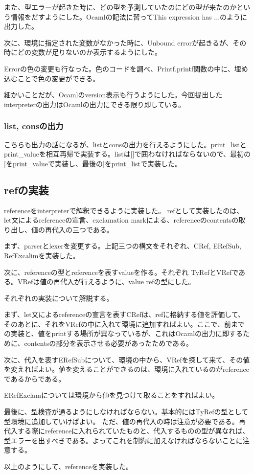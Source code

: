 \documentclass[uplatex,12pt]{jsarticle}
\begin{document}
また、型エラーが起きた時に、どの型を予測していたのにどの型が来たのかという情報をだすようにした。Ocamlの記法に習ってThis expression has ...のように出力した。

次に、環境に指定された変数がなかった時に、Unbound errorが起きるが、その時にどの変数が足りないのか表示するようにした。

Errorの色の変更も行なった。色のコードを調べ、Printf.printf関数の中に、埋め込むことで色の変更ができる。

細かいことだが、Ocamlのversion表示も行うようにした。今回提出したinterpreterの出力はOcamlの出力にできる限り即している。

\subsubsection{list, consの出力}
こちらも出力の話になるが、listとconsの出力を行えるようにした。print\_listとprint\_valueを相互再帰で実装する。listは[]で囲わなければならないので、最初の[をprint\_valueで実装し、最後の]をprint\_listで実装した。

\subsection{refの実装}
referenceをinterpreterで解釈できるように実装した。
refとして実装したのは、let文によるreferenceの宣言、exclamation markによる、referenceのcontentsの取り出し、値の再代入の三つである。

まず、parserとlexerを変更する。上記三つの構文をそれぞれ、CRef, ERefSub, RefExcalimを実装した。

次に、referenceの型とreferenceを表すvalueを作る。それぞれ
TyRefとVRefである。VRefは値の再代入が行えるように、value refの型にした。

それぞれの実装について解説する。

まず、let文によるreferenceの宣言を表すCRefは、refに格納する値を評価して、そのあとに、それをVRefの中に入れて環境に追加すればよい。ここで、前までの実装と、値をprintする場所が異なっているが、これはOcamlの出力に即するために、contentsの部分を表示させる必要があったためである。

次に、代入を表すERefSubについて、環境の中から、VRefを探して来て、その値を変えればよい。値を変えることができるのは、環境に入れているのがreferenceであるからである。

ERefExclamについては環境から値を見つけて取ることをすればよい。

最後に、型検査が通るようにしなければならない。基本的にはTyRefの型として型環境に追加していけばよい。
ただ、値の再代入の時は注意が必要である。再代入する際にreferenceに入れられていたものと、代入するものの型が異なれば、型エラーを出すべきである。よってこれを制約に加えなければならないことに注意する。

以上のようにして、referenceを実装した。
\end{document}
